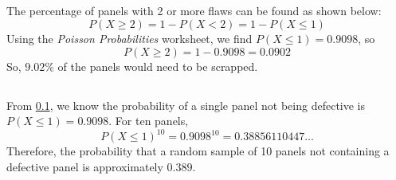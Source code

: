 \documentclass[letterpaper]{article}
\begin{document}
\subsection{}%
\label{2b}
The percentage of panels with 2 or more flaws can be found as shown below:
$$P(X\geq2)=1-P(X<2) = 1-P(X\leq1)$$
Using the \textit{Poisson Probabilities} worksheet,
we find $P(X\leq1)=0.9098$, so
$$P(X\geq2) = 1-0.9098 = 0.0902 $$
So, $9.02\%$ of the panels would need to be scrapped.


\subsection{}%
From \ref{2b}, we know the probability of a single panel not being defective is $P(X\leq1)=0.9098$.
For ten panels, $$ P(X\leq1)^{10} = 0.9098^{10} = 0.38856110447...$$
Therefore, the probability that a random sample of 10 panels not containing
a defective panel is approximately $0.389$.


\section{}%

\subsection{}%

\subsection{}%

\section{}%
\end{document}
